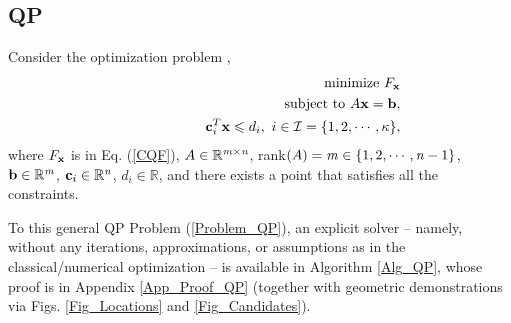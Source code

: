 \documentclass{imaman}
\newcommand{\beq}{\begin{eqnarray}}
\newcommand{\eeq}{\end{eqnarray}}
\newcommand{\bfb}{{\bf b}}
\newcommand{\bfc}{{\bf c}}
\newcommand{\bfx}{{\bf x}}
\newcommand{\real}{\mathbb{R}}
\newcommand{\calI}{{\mathcal I}}
\newcommand{\itm}{{\it m}}
\newcommand{\itn}{{\it n}}
\numberwithin{equation}{section}
\begin{document}
\subsection{QP}
\label{Subsec_QP}
Consider the optimization problem \cite{Lu(Ye):03(16)},
\beq
&&\mbox{minimize}~F_\bfx\nonumber\\
&&\mbox{subject to}~A\bfx=\bfb,\nonumber\\
&&\hspace{1.84cm}\bfc_i^T\bfx\le d_i,~i\in\calI=\{1,2,\cdots,\kappa\},
\label{Problem_QP}
\eeq
where $F_\bfx$ is in Eq. (\ref{CQF}), $A\in\real^{\itm\times\itn}$, rank$(A)=\itm\in\{1,2,\cdots,\itn-1\}$, $\bfb\in\real^\itm$, $\bfc_i\in\real^\itn$, $d_i\in\real$, and there exists a point that satisfies all the constraints.

To this general QP Problem (\ref{Problem_QP}), an explicit solver -- namely, without any iterations, approximations, or assumptions as in the classical/numerical optimization \cite{Lu(Ye):03(16),NoWr:06} -- is available in Algorithm \ref{Alg_QP}, whose proof is in Appendix \ref{App_Proof_QP} (together with geometric demonstrations via Figs. \ref{Fig_Locations} and \ref{Fig_Candidates}).
\end{document}
